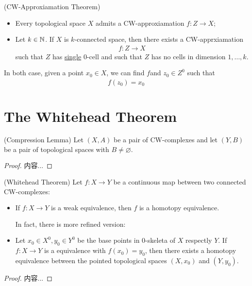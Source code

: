 \documentclass[Total.tex]{subfiles}
\begin{document}
			\begin{theorem}
				(CW-Approxiamation Theorem)
				\begin{itemize}
					\item Every topological space $X$ admits a CW-approxiamation $f:Z\rightarrow X$;
					\item Let $k\in \mathbb{N}$. If $X$ is $k$-connected space, then there exists a CW-apprxiamation  
					\begin{gather*}
						f:Z\rightarrow X
					\end{gather*}
					such that $Z$ has \underline{single} $0$-cell and such that $Z$ has no cells in dimension $1,\dots,k$.
				\end{itemize}
				In both case, given a point $x_0\in X$, we can find $f$and $z_0\in Z^0$ such that
				\begin{gather*}
					f(z_0)=x_0
				\end{gather*}
			\end{theorem}
	\section{The Whitehead Theorem}
			\begin{lemma}
			(Compression Lemma) Let $(X,A)$ be a pair of CW-complexes and let $(Y,B)$ be a pair of topological spaces with $B\not=\varnothing.$ 
			
			
		\end{lemma}
		\begin{proof}
			内容...
		\end{proof}
		\begin{theorem}
		
			(Whitehead Theorem) Let $f:X\rightarrow Y$ be a continuous map between two connected CW-complexes:
			\begin{itemize}
				\item If $f:X\rightarrow Y$ is a weak equivalence, then $f$ is a homotopy equivalence.
				
				In fact, there is more refined version:
				\item Let $x_0\in X^0,y_0\in Y^0$ be the base points in $0$-skeleta of $X$ respectly $Y$. If $f:X\rightarrow Y$ is a equivalence with $f(x_0)=y_0$, then there exists a homotopy equivalence between the pointed topological spaces $(X,x_0)$ and $(Y,y_0)$.
			\end{itemize}
		\end{theorem}
		\begin{proof}
			内容...
		\end{proof}
\end{document}
